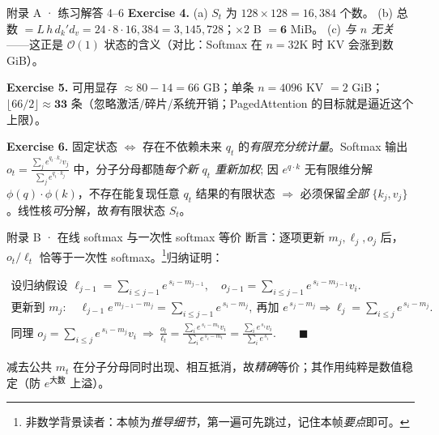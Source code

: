 \documentclass[aspectratio=169,10pt]{beamer}
\newcommand{\bigO}[1]{\mathcal{O}\!\left(#1\right)}
\newcommand{\proofskipnote}{\footnote{\scriptsize 非数学背景读者：本帧为\emph{推导细节}，第一遍可先跳过，记住本帧\emph{要点}即可。}}
\begin{document}
\begin{frame}{附录 A · 练习解答 4--6}
  \footnotesize
  \textbf{Exercise 4.} (a) $S_t$ 为 $128\times128=16{,}384$ 个数。
  (b) 总数 $=L\,h\,d_k'd_v=24\cdot8\cdot16{,}384=3{,}145{,}728$；$\times2$ B $=\mathbf{6}$ MiB。
  (c) \emph{与 $n$ 无关}——这正是 $\bigO{1}$ 状态的含义（对比：Softmax 在 $n{=}32$K 时 KV 会涨到数 GiB）。
  \medskip

  \textbf{Exercise 5.} 可用显存 $\approx 80-14=66$ GB；单条 $n{=}4096$ KV $=2$ GiB；
  $\lfloor 66/2\rfloor \approx \mathbf{33}$ 条（忽略激活/碎片/系统开销；PagedAttention 的目标就是逼近这个上限）。
  \medskip

  \textbf{Exercise 6.} 固定状态 $\Leftrightarrow$ 存在不依赖未来 $q_t$ 的\emph{有限充分统计量}。Softmax 输出
  $o_t=\frac{\sum_j e^{q_t\cdot k_j}v_j}{\sum_j e^{q_t\cdot k_j}}$ 中，分子分母都随\emph{每个新 $q_t$ 重新加权};
  因 $e^{q\cdot k}$ 无有限维分解 $\phi(q)\!\cdot\!\phi(k)$，不存在能复现任意 $q_t$ 结果的有限状态 $\Rightarrow$ 必须保留\emph{全部} $\{k_j,v_j\}$。线性核\emph{可}分解，故\emph{有}有限状态 $S_t$。
\end{frame}

\begin{frame}{附录 B · 在线 softmax 与一次性 softmax 等价}
  \footnotesize 断言：逐项更新 $m_j,\ell_j,o_j$ 后，$o_t/\ell_t$ 恰等于一次性 softmax。\proofskipnote 归纳证明：
  \begin{TLeqderiv}
  \begin{align*}
    \text{设归纳假设 } \ell_{j-1}=\sum_{i\le j-1} e^{\,s_i-m_{j-1}},\quad
    o_{j-1}=\sum_{i\le j-1} e^{\,s_i-m_{j-1}}v_i.\\
    \text{更新到 } m_j:\quad
    \ell_{j-1}e^{\,m_{j-1}-m_j}=\sum_{i\le j-1}e^{\,s_i-m_j},\ \text{再加 } e^{\,s_j-m_j}
    \Rightarrow \ell_j=\sum_{i\le j}e^{\,s_i-m_j}.\\
    \text{同理 } o_j=\sum_{i\le j}e^{\,s_i-m_j}v_i
    \ \Rightarrow\ \frac{o_t}{\ell_t}=\frac{\sum_i e^{\,s_i-m_t}v_i}{\sum_i e^{\,s_i-m_t}}
    =\frac{\sum_i e^{\,s_i}v_i}{\sum_i e^{\,s_i}}.\qquad\blacksquare
  \end{align*}
  \end{TLeqderiv}
  减去公共 $m_t$ 在分子分母同时出现、相互抵消，故\emph{精确}等价；其作用纯粹是数值稳定（防 $e^{\text{大数}}$ 上溢）。
\end{frame}
\end{document}
